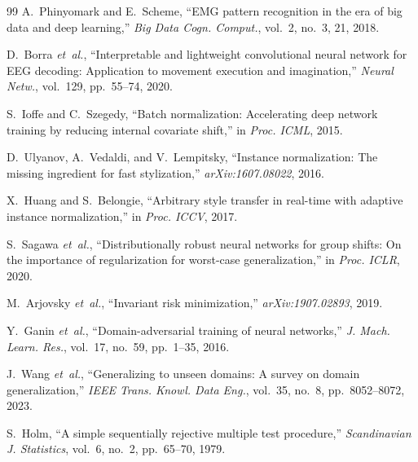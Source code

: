 \documentclass[conference]{IEEEtran}
\newcommand{\etal}{\mbox{\textit{et~al.}}}
\begin{document}
\begin{thebibliography}{99}
A.~Phinyomark and E.~Scheme, ``EMG pattern recognition in the era of big data and deep learning,'' \textit{Big Data Cogn. Comput.}, vol.~2, no.~3, 21, 2018.

D.~Borra \etal, ``Interpretable and lightweight convolutional neural network for EEG decoding: Application to movement execution and imagination,'' \textit{Neural Netw.}, vol.~129, pp.~55--74, 2020.

S.~Ioffe and C.~Szegedy, ``Batch normalization: Accelerating deep network training by reducing internal covariate shift,'' in \textit{Proc. ICML}, 2015.

D.~Ulyanov, A.~Vedaldi, and V.~Lempitsky, ``Instance normalization: The missing ingredient for fast stylization,'' \textit{arXiv:1607.08022}, 2016.

X.~Huang and S.~Belongie, ``Arbitrary style transfer in real-time with adaptive instance normalization,'' in \textit{Proc. ICCV}, 2017.

S.~Sagawa \etal, ``Distributionally robust neural networks for group shifts: On the importance of regularization for worst-case generalization,'' in \textit{Proc. ICLR}, 2020.

M.~Arjovsky \etal, ``Invariant risk minimization,'' \textit{arXiv:1907.02893}, 2019.

Y.~Ganin \etal, ``Domain-adversarial training of neural networks,'' \textit{J. Mach. Learn. Res.}, vol.~17, no.~59, pp.~1--35, 2016.

J.~Wang \etal, ``Generalizing to unseen domains: A survey on domain generalization,'' \textit{IEEE Trans. Knowl. Data Eng.}, vol.~35, no.~8, pp.~8052--8072, 2023.

S.~Holm, ``A simple sequentially rejective multiple test procedure,'' \textit{Scandinavian J. Statistics}, vol.~6, no.~2, pp.~65--70, 1979.

\end{thebibliography}
\end{document}
